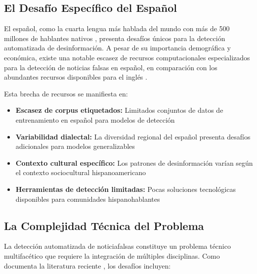 \subsection{El Desafío Específico del Español}

El español, como la cuarta lengua más hablada del mundo con más de 500 millones de hablantes nativos \cite{acosta2019construccion}, presenta desafíos únicos para la detección automatizada de desinformación. A pesar de su importancia demográfica y económica, existe una notable escasez de recursos computacionales especializados para la detección de noticias falsas en español, en comparación con los abundantes recursos disponibles para el inglés \cite{posadas2019detection}.

Esta brecha de recursos se manifiesta en:
\begin{itemize}
    \item \textbf{Escasez de corpus etiquetados:} Limitados conjuntos de datos de entrenamiento en español para modelos de detección
    \item \textbf{Variabilidad dialectal:} La diversidad regional del español presenta desafíos adicionales para modelos generalizables
    \item \textbf{Contexto cultural específico:} Los patrones de desinformación varían según el contexto sociocultural hispanoamericano
    \item \textbf{Herramientas de detección limitadas:} Pocas soluciones tecnológicas disponibles para comunidades hispanohablantes
\end{itemize}

\subsection{La Complejidad Técnica del Problema}

La detección automatizada de \glspl{noticiafalsa} constituye un problema técnico multifacético que requiere la integración de múltiples disciplinas. Como documenta la literatura reciente \cite{singh2023comprehensive}, los desafíos incluyen:


